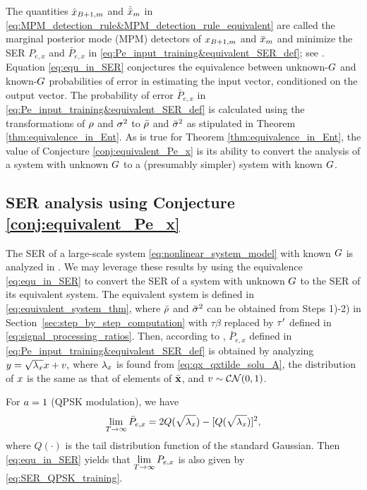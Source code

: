 \documentclass[12pt, draftclsnofoot,journal,onecolumn]{IEEEtran}
\begin{document}
The quantities $\hat{x}_{B+1,m}$ and ${\hat{{\bar{x}}}}_m$ in \eqref{eq:MPM_detection_rule&MPM_detection_rule_equivalent} are called the marginal posterior mode (MPM) detectors of $x_{B+1,m}$ and ${\bar{x}}_m$ and minimize the SER $P_{e,x}$ and $\bar{P}_{e,x}$ in \eqref{eq:Pe_input_training&equivalent_SER_def}; see \cite{tanaka2001analysis,tanaka2002statistical}.
Equation \eqref{eq:equ_in_SER} conjectures the equivalence between unknown-$G$ and known-$G$ probabilities of error in estimating the input vector, conditioned on the output vector.  The probability of error $\bar{P}_{e,x}$ in \eqref{eq:Pe_input_training&equivalent_SER_def} is calculated using the transformations of $\rho$ and $\sigma_{}^2$ to $\bar{\rho}$ and $\bar{\sigma}_{}^2$ as stipulated in Theorem \ref{thm:equivalence_in_Ent}. 
As is true for Theorem \ref{thm:equivalence_in_Ent}, the value of Conjecture \ref{conj:equivalent_Pe_x} is its ability to convert the analysis of a system with unknown $G$ to a (presumably simpler) system with known $G$.

\subsection{SER analysis using Conjecture \ref{conj:equivalent_Pe_x}}
The SER of a large-scale system \eqref{eq:nonlinear_system_model} with known $G$ is analyzed in \cite{wen2016bayes}.  We may leverage these results by using the equivalence \eqref{eq:equ_in_SER} to convert the SER of a system with unknown $G$ to the SER of its equivalent system. The equivalent system is defined in \eqref{eq:equivalent_system_thm}, where $\bar{\rho}$ and $\bar{\sigma}_{}^2$ can be obtained from Steps 1)-2) in Section~\ref{sec:step_by_step_computation} with $\tau\beta$ replaced by $\tau'$ defined in \eqref{eq:signal_processing_ratios}.  Then, according to \cite{wen2016bayes}, $\bar{P}_{e,x}$ defined in \eqref{eq:Pe_input_training&equivalent_SER_def} is obtained by analyzing $ y = \sqrt{\lambda_x}x+v,$
where $\lambda_x$ is found from \eqref{eq:qx_qxtilde_solu_A}, the distribution of $x$ is the same as that of elements of $\bar{{\mathbf{x}}}$, and $v\sim\mathcal{C}\mathcal{N}(0,1)$.  

For $a=1$ (QPSK modulation), we have
\begin{align}
    \lim_{T\to\infty} \bar{P}_{e,x} = 2Q(\sqrt{\lambda_x}) - [Q(\sqrt{\lambda_x})]^2,
    \label{eq:SER_QPSK_training}
\end{align}
where $Q(\cdot)$ is the tail distribution function of the standard Gaussian.  Then \eqref{eq:equ_in_SER} yields that $\lim\limits_{T\to\infty} P_{e,x}$ is also given by \eqref{eq:SER_QPSK_training}.
\end{document}
